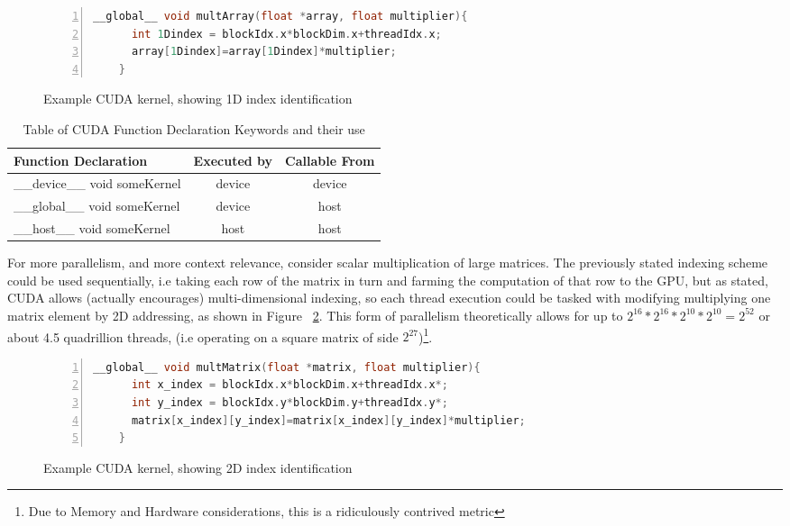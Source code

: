 \begin{figure}[!h]
  \centering
    \begin{lstlisting}[numbers=left, language=C, numberstyle=\tiny, numbersep=8pt]
    __global__ void multArray(float *array, float multiplier){
      int 1Dindex = blockIdx.x*blockDim.x+threadIdx.x;
      array[1Dindex]=array[1Dindex]*multiplier;
    }
    \end{lstlisting}
  \caption{Example CUDA kernel, showing 1D index identification}
  \label{fig:GridBlockThread1D}
\end{figure}


\begin{table}[!ht]
\begin{tabularx}{\textwidth}{|X|c|c|}
Function Declaration&Executed by&Callable From\\\hline
\_\_device\_\_ void someKernel&device&device\\
\_\_global\_\_ void someKernel&device&host\\
\_\_host\_\_ void someKernel&host&host\\
\end{tabularx}
\caption{Table of CUDA Function Declaration Keywords and their use}\label{tab:CUDAFuncDecTable}
\end{table}

For more parallelism, and more context relevance, consider scalar multiplication of large matrices. The previously stated indexing scheme could be used sequentially, i.e taking each row of the matrix in turn and farming the computation of that row to the GPU, but as stated, CUDA allows (actually encourages) multi-dimensional indexing, so each thread execution could be tasked with modifying multiplying one matrix element by 2D addressing, as shown in Figure ~\ref{fig:GridBlockThread2D}. This form of parallelism theoretically allows for up to \(2^{16}*2^{16}*2^{10}*2^{10}=2^{52}\) or about 4.5 quadrillion threads, (i.e operating on a square matrix of side \(2^{27}\))\footnote{Due to Memory and Hardware considerations, this is a ridiculously contrived metric}.

\begin{figure}[!h]
  \centering
    \begin{lstlisting}[numbers=left, language=C, numberstyle=\tiny, numbersep=8pt]
    __global__ void multMatrix(float *matrix, float multiplier){
      int x_index = blockIdx.x*blockDim.x+threadIdx.x*;
      int y_index = blockIdx.y*blockDim.y+threadIdx.y*;
      matrix[x_index][y_index]=matrix[x_index][y_index]*multiplier;
    }
    \end{lstlisting}
  \caption{Example CUDA kernel, showing 2D index identification}
  \label{fig:GridBlockThread2D}
\end{figure}

